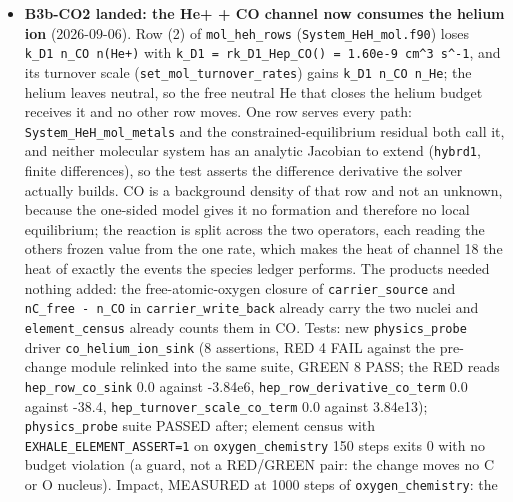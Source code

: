 \documentclass[english,a4paper]{my_memo}
\begin{document}
\begin{itemize}
  \texttt{write\_setup\_report.f90} 18, 925-934 (CEILING-DEL, after B4-1 releases
  main); heat is deposited for carrier reactions whose products a
  never-covered carrier interval does not deliver (\texttt{oxygen\_chemistry} in init
  mode never covers one), an operator-split defect that B4-1c and B5 address
  and that leaves the oxygen case without an end-to-end gate for its CO
  source; \texttt{heat\_channel\_state} now has 19 columns (checkpointed by
  B3c-COST); \texttt{python/paper\_data.py} \texttt{HEAT\_FIXED} stale.
\item
  \textbf{B3b-CO2 landed: the He+ + CO channel now consumes the helium ion}
  (2026-09-06). Row (2) of \texttt{mol\_heh\_rows} (\texttt{System\_HeH\_mol.f90}) loses
  \texttt{k\_D1\ n\_CO\ n(He+)} with \texttt{k\_D1\ =\ rk\_D1\_Hep\_CO()\ =\ 1.60e-9\ cm\^{}3\ s\^{}-1}, and
  its turnover scale (\texttt{set\_mol\_turnover\_rates}) gains \texttt{k\_D1\ n\_CO\ n\_He}; the
  helium leaves neutral, so the free neutral He that closes the helium budget
  receives it and no other row moves. One row serves every path:
  \texttt{System\_HeH\_mol\_metals} and the constrained-equilibrium residual both call
  it, and neither molecular system has an analytic Jacobian to extend
  (\texttt{hybrd1}, finite differences), so the test asserts the difference
  derivative the solver actually builds. CO is a background density of that
  row and not an unknown, because the one-sided model gives it no formation
  and therefore no local equilibrium; the reaction is split across the two
  operators, each reading the other\textquotesingle s frozen value from the one rate, which
  makes the heat of channel 18 the heat of exactly the events the species
  ledger performs. The products needed nothing added: the free-atomic-oxygen
  closure of \texttt{carrier\_source} and \texttt{nC\_free\ -\ n\_CO} in \texttt{carrier\_write\_back}
  already carry the two nuclei and \texttt{element\_census} already counts them in
  CO. Tests: new \texttt{physics\_probe} driver \texttt{co\_helium\_ion\_sink} (8 assertions,
  RED 4 FAIL against the pre-change module relinked into the same suite,
  GREEN 8 PASS; the RED reads \texttt{hep\_row\_co\_sink} 0.0 against -3.84e6,
  \texttt{hep\_row\_derivative\_co\_term} 0.0 against -38.4, \texttt{hep\_turnover\_scale\_co\_term}
  0.0 against 3.84e13); \texttt{physics\_probe} suite PASSED after; element census
  with \texttt{EXHALE\_ELEMENT\_ASSERT=1} on \texttt{oxygen\_chemistry} 150 steps exits 0 with
  no budget violation (a guard, not a RED/GREEN pair: the change moves no C
  or O nucleus). Impact, MEASURED at 1000 steps of \texttt{oxygen\_chemistry}: the

\end{itemize}
\end{document}

